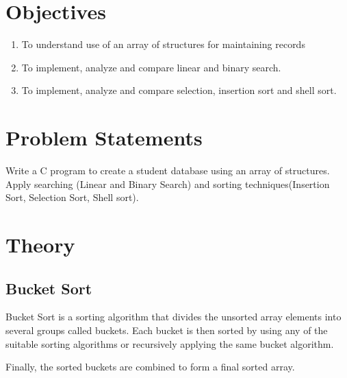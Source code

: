 \documentclass[11pt]{article}
\begin{document}
\tableofcontents
\thispagestyle{empty}
\clearpage


\setcounter{page}{1}

\section{Objectives}
\begin{enumerate}
	\item To understand use of an array of structures for maintaining records
	\item To implement, analyze and compare linear and binary search.
	\item To implement, analyze and compare selection, insertion sort and shell sort.
\end{enumerate}

\section{Problem Statements}
Write a C program to create a student database using an array of structures. Apply searching (Linear and Binary Search) and sorting techniques(Insertion Sort, Selection Sort, Shell sort).

\section{Theory}

\subsection{Bucket Sort}
Bucket Sort is a sorting algorithm that divides the unsorted array elements into several groups called buckets. Each bucket is then sorted by using any of the suitable sorting algorithms or recursively applying the same bucket algorithm.

Finally, the sorted buckets are combined to form a final sorted array.\\
\end{document}
